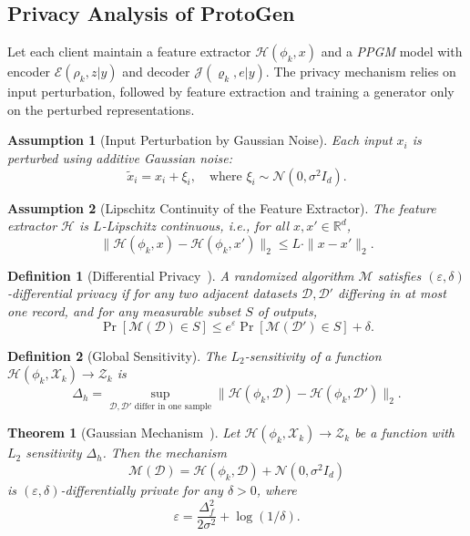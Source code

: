 \documentclass[lettersize,journal]{IEEEtran}
\newtheorem{assumption}{Assumption}
\newtheorem{theorem}{Theorem}
\newtheorem{definition}{Definition}
\begin{document}
\subsection{Privacy Analysis of \textsf{ProtoGen}}

Let each client maintain a feature extractor $\mathcal{H}(\phi_k,x)$ and a \emph{PPGM} model with encoder $\mathcal{E}(\rho_k,z|y)$ and decoder $\mathcal{J}(\varrho_k, e|y)$. The privacy mechanism relies on input perturbation, followed by feature extraction and training a generator only on the perturbed representations.

\begin{assumption}[Input Perturbation by Gaussian Noise]
\label{asm:6}
Each input $x_i$ is perturbed using additive Gaussian noise:
\[
\tilde{x}_i = x_i + \xi_i, \quad \text{where } \xi_i \sim \mathcal{N}(0, \sigma^2 I_d).
\]
\end{assumption}

\begin{assumption}[Lipschitz Continuity of the Feature Extractor]
\label{asm:7}
The feature extractor $\mathcal{H}$ is $L$-Lipschitz continuous, i.e., for all $x, x' \in \mathbb{R}^d$,
\[
\|\mathcal{H}(\phi_k,x) - \mathcal{H}(\phi_k,x')\|_2 \leq L \cdot \|x - x'\|_2.
\]
\end{assumption}

\begin{definition}[Differential Privacy~\cite{dwork2014algorithmic}]
A randomized algorithm $\mathcal{M}$ satisfies $(\varepsilon, \delta)$-differential privacy if for any two adjacent datasets $\mathcal{D}, \mathcal{D}'$ differing in at most one record, and for any measurable subset $S$ of outputs,
\[
\Pr[\mathcal{M}(\mathcal{D}) \in S] \leq e^\varepsilon \Pr[\mathcal{M}(\mathcal{D}') \in S] + \delta.
\]
\end{definition}

\begin{definition}[Global Sensitivity]
The $L_2$-sensitivity of a function $\mathcal{H}(\phi_k,\mathcal{X}_k) \rightarrow \mathcal{Z}_k$ is
\[
\Delta_h = \sup_{\mathcal{D}, \mathcal{D}' \text{ differ in one sample}} \|\mathcal{H}(\phi_k,\mathcal{D}) - \mathcal{H}(\phi_k,\mathcal{D}')\|_2.
\]
\end{definition}

\begin{theorem}[Gaussian Mechanism~\cite{dwork2014algorithmic}]
Let $\mathcal{H}(\phi_k,\mathcal{X}_k) \rightarrow \mathcal{Z}_k$ be a function with $L_2$ sensitivity $\Delta_h$. Then the mechanism
\[
\mathcal{M}(\mathcal{D}) = \mathcal{H}(\phi_k,\mathcal{D}) + \mathcal{N}(0, \sigma^2 I_d)
\]
is $(\varepsilon, \delta)$-differentially private for any $\delta > 0$, where
\[
\varepsilon = \frac{\Delta_f^2}{2 \sigma^2} + \log(1/\delta).
\]
\end{theorem}
\end{document}
